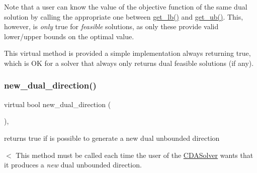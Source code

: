Note that a user can know the value of the objective function of the same dual solution by calling the appropriate one between \mbox{\hyperlink{class_s_m_spp__di__unipi__it_1_1_solver_a4a4dbe4c2416d531c4619ca94fc07d31}{get\+\_\+lb()}} and \mbox{\hyperlink{class_s_m_spp__di__unipi__it_1_1_solver_a7304d819b2eeff3d4ba650055b24e3a5}{get\+\_\+ub()}}. This, however, is {\itshape only} true for {\itshape feasible} solutions, as only these provide valid lower/upper bounds on the optimal value.

This virtual method is provided a simple implementation always returning true, which is OK for a solver that always only returns dual feasible solutions (if any). \mbox{\label{class_s_m_spp__di__unipi__it_1_1_c_d_a_solver_ad83925e362d49bbe570a881791e45ea0}} 
\subsubsection{\texorpdfstring{new\+\_\+dual\+\_\+direction()}{new\_dual\_direction()}}
{\footnotesize\ttfamily virtual bool new\+\_\+dual\+\_\+direction (\begin{DoxyParamCaption}\item[{void}]{ }\end{DoxyParamCaption})\hspace{0.3cm}{\ttfamily [inline]}, {\ttfamily [virtual]}}



returns true if is possible to generate a new dual unbounded direction 

$<$ This method must be called each time the user of the \mbox{\hyperlink{class_s_m_spp__di__unipi__it_1_1_c_d_a_solver}{C\+D\+A\+Solver}} wants that it produces a {\itshape new} dual unbounded direction.

